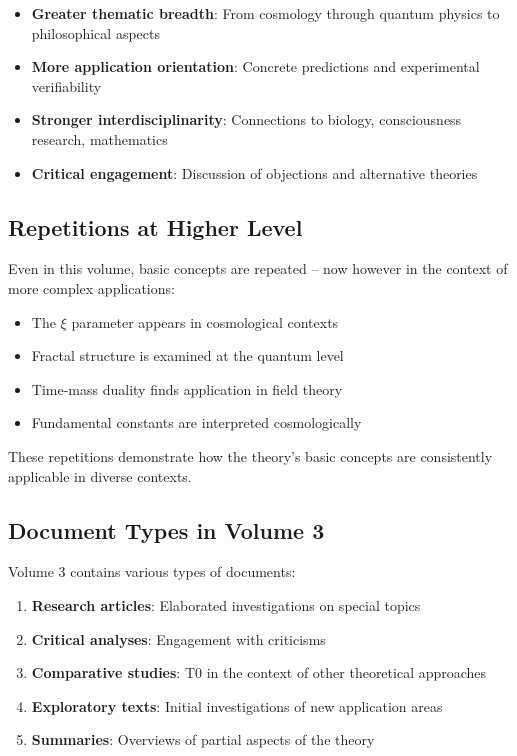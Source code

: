 \begin{itemize}
\item \textbf{Greater thematic breadth}: From cosmology through quantum physics to philosophical aspects
\item \textbf{More application orientation}: Concrete predictions and experimental verifiability
\item \textbf{Stronger interdisciplinarity}: Connections to biology, consciousness research, mathematics
\item \textbf{Critical engagement}: Discussion of objections and alternative theories
\end{itemize}

\subsection*{Repetitions at Higher Level}

Even in this volume, basic concepts are repeated -- now however in the context of more complex applications:

\begin{itemize}
\item The $\xi$ parameter appears in cosmological contexts
\item Fractal structure is examined at the quantum level
\item Time-mass duality finds application in field theory
\item Fundamental constants are interpreted cosmologically
\end{itemize}

These repetitions demonstrate how the theory's basic concepts are consistently applicable in diverse contexts.

\subsection*{Document Types in Volume 3}

Volume 3 contains various types of documents:

\begin{enumerate}
\item \textbf{Research articles}: Elaborated investigations on special topics
\item \textbf{Critical analyses}: Engagement with criticisms
\item \textbf{Comparative studies}: T0 in the context of other theoretical approaches
\item \textbf{Exploratory texts}: Initial investigations of new application areas
\item \textbf{Summaries}: Overviews of partial aspects of the theory
\end{enumerate}

